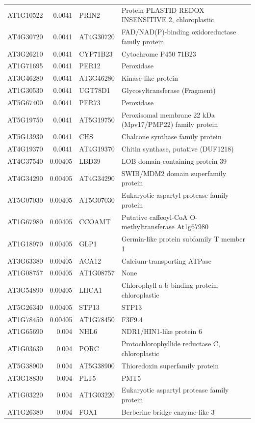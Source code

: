 \documentclass[11pt]{article}
\begin{document}
\begin{center}
\begin{tabular}{lrll}
AT1G10522 & 0.0041 & PRIN2 & Protein PLASTID REDOX INSENSITIVE 2, chloroplastic\\
AT4G30720 & 0.0041 & AT4G30720 & FAD/NAD(P)-binding oxidoreductase family protein\\
AT3G26210 & 0.0041 & CYP71B23 & Cytochrome P450 71B23\\
AT1G71695 & 0.0041 & PER12 & Peroxidase\\
AT3G46280 & 0.0041 & AT3G46280 & Kinase-like protein\\
AT1G30530 & 0.0041 & UGT78D1 & Glycosyltransferase (Fragment)\\
AT5G67400 & 0.0041 & PER73 & Peroxidase\\
AT5G19750 & 0.0041 & AT5G19750 & Peroxisomal membrane 22 kDa (Mpv17/PMP22) family protein\\
AT5G13930 & 0.0041 & CHS & Chalcone synthase family protein\\
AT4G19370 & 0.0041 & AT4G19370 & Chitin synthase, putative (DUF1218)\\
AT4G37540 & 0.00405 & LBD39 & LOB domain-containing protein 39\\
AT4G34290 & 0.00405 & AT4G34290 & SWIB/MDM2 domain superfamily protein\\
AT5G07030 & 0.00405 & AT5G07030 & Eukaryotic aspartyl protease family protein\\
AT1G67980 & 0.00405 & CCOAMT & Putative caffeoyl-CoA O-methyltransferase At1g67980\\
AT1G18970 & 0.00405 & GLP1 & Germin-like protein subfamily T member 1\\
AT3G63380 & 0.00405 & ACA12 & Calcium-transporting ATPase\\
AT1G08757 & 0.00405 & AT1G08757 & None\\
AT3G54890 & 0.00405 & LHCA1 & Chlorophyll a-b binding protein, chloroplastic\\
AT5G26340 & 0.00405 & STP13 & STP13\\
AT1G78450 & 0.00405 & AT1G78450 & F3F9.4\\
AT1G65690 & 0.004 & NHL6 & NDR1/HIN1-like protein 6\\
AT1G03630 & 0.004 & PORC & Protochlorophyllide reductase C, chloroplastic\\
AT5G38900 & 0.004 & AT5G38900 & Thioredoxin superfamily protein\\
AT3G18830 & 0.004 & PLT5 & PMT5\\
AT1G03220 & 0.004 & AT1G03220 & Eukaryotic aspartyl protease family protein\\
AT1G26380 & 0.004 & FOX1 & Berberine bridge enzyme-like 3\\

\end{tabular}
\end{center}
\end{document}

